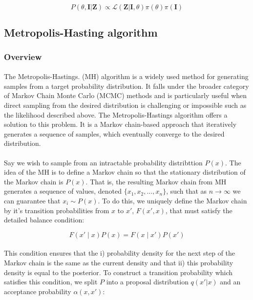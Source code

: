 \documentclass{article}
\begin{document}
\begin{equation}
\label{eq:bayes}
P(\theta, \mathbf{I} | \mathbf{Z}) \propto \mathcal{L}(\mathbf{Z} | \mathbf{I}, \theta)\pi(\theta)\pi(\mathbf{I})
\end{equation}


\subsection{Metropolis-Hasting algorithm}

\subsubsection{Overview}
\paragraph{} The Metropolis-Hastings. (MH) algorithm is a widely used method for generating samples from a target probability distribution. It falls under the broader category of Markov Chain Monte Carlo (MCMC) methods and is particularly useful when direct sampling from the desired distribution is challenging or impossible such as the likelihood described above. The Metropolis-Hastings algorithm offers a solution to this problem. It is a Markov chain-based approach that iteratively generates a sequence of samples, which eventually converge to the desired distribution. 

\paragraph{}Say we wish to sample from an intractable probability distribttion $P(x)$. The idea of the MH is to define a Markov chain so that the stationary distribution of the Markov chain is $P(x)$. That is, the resulting Markov chain from MH generates a sequence of values, denoted $\{x_1, x_2, \dots,  x_n\}$, such that as $n \rightarrow \infty$ we can guarantee that $x_i \sim P(x)$. To do this, we uniquely define the Markov chain by it's transition probabilities from $x$ to $x'$, $F(x', x)$, that must satisfy the detailed balance condition:

\begin{equation}
\label{eq:db}
F(x' \mid x)P(x)=  F(x\mid x')P(x')
\end{equation}

\paragraph{}This condition ensures that the i) probability density for the next step of the Markov chain is the same as the current density and that ii) this probability density is equal to the posterior.  To construct a transition probability which satisfies this condition, we split $P$ into a proposal distribution $q(x' | x)$ and an acceptance probability $\alpha(x, x')$:
\end{document}
